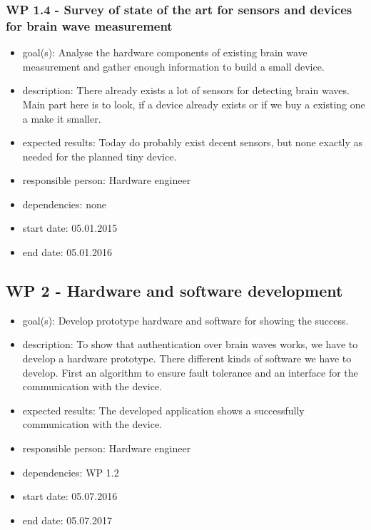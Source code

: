 \subsubsection*{WP 1.4 - Survey of state of the art for sensors and devices for brain wave measurement}
\begin{itemize}
 \item goal(s): Analyse the hardware components of existing brain wave measurement and gather enough information to build a small device.
 \item description: There already exists a lot of sensors for detecting brain waves. Main part here is to look, if a device already exists or if we buy a existing one a make it smaller.
 \item expected results: Today do probably exist decent sensors, but none exactly as needed for the planned tiny device.
 \item responsible person: Hardware engineer
 \item dependencies: none
 \item start date: 05.01.2015
 \item end date: 05.01.2016
\end{itemize}

\subsection*{WP 2 - Hardware and software development}
\begin{itemize}
 \item goal(s): Develop prototype hardware and software for showing the success.
 \item description: To show that authentication over brain waves works, we have to develop a hardware prototype. There different kinds of software we have to develop. First an algorithm to ensure fault tolerance and an interface for the communication with the device.
 \item expected results: The developed application shows a successfully communication with the device.
 \item responsible person: Hardware engineer
 \item dependencies: WP 1.2
 \item start date: 05.07.2016
 \item end date: 05.07.2017
\end{itemize}

